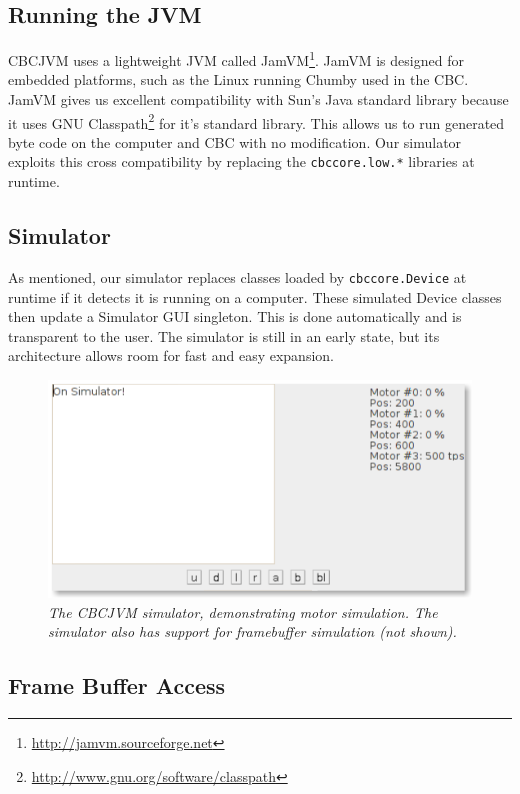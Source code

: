 \documentclass[12pt,letterpaper]{article}
\newcommand{\urlfootnote}[1]{\footnote{\url{#1}}}
\begin{document}
\subsection{Running the JVM}

CBCJVM uses a lightweight JVM called JamVM\urlfootnote{http://jamvm.sourceforge.net}. JamVM is designed for embedded platforms, such as the Linux running Chumby used in the CBC. JamVM gives us excellent compatibility with Sun's Java standard library because it uses GNU Classpath\urlfootnote{http://www.gnu.org/software/classpath} for it's standard library. This allows us to run generated byte code on the computer and CBC with no modification. Our simulator exploits this cross compatibility by replacing the \texttt{cbccore.low.*} libraries at runtime.



\subsection{Simulator}

As mentioned, our simulator replaces classes loaded by \texttt{cbccore.Device} at runtime if it detects it is running on a computer. These simulated Device classes then update a Simulator GUI singleton. This is done automatically and is transparent to the user. The simulator is still in an early state, but its architecture allows room for fast and easy expansion.

\begin{figure}[h]
\begin{flushright}
\includegraphics[width=.75\textwidth]{simulator.png}
\end{flushright}
\caption{\textit{The CBCJVM simulator, demonstrating motor simulation. The simulator also has support for framebuffer simulation (not shown).}}
\end{figure}


\subsection{Frame Buffer Access}
\end{document}
